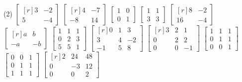 \begin{tasks}[
    start=108,
    style=enumerate,
    label-offset = 5mm,
    ](2)
    \task $\begin{bmatrix*}[r]3 & -2 \\ 5 & -4\end{bmatrix*}$
    \task $\begin{bmatrix*}[r]4 & -7 \\ -8 & 14\end{bmatrix*}$
    \task $\begin{bmatrix*}1 & 0 \\ 0 & 1\end{bmatrix*}$
    \task $\begin{bmatrix*}1 & 1 \\ 3 & 3\end{bmatrix*}$
    \task $\begin{bmatrix*}[r]8 & -2 \\ 16 & -4\end{bmatrix*}$
    \task $\begin{bmatrix*}[r]a & b \\ -a & -b\end{bmatrix*}$\newpage
    \task $\begin{bmatrix*}1 & 1 & 1 \\ 0 & 2 & 3 \\ 5 & 5 & 1\end{bmatrix*}$
    \task $\begin{bmatrix*}[r]0 & 1 & 3 \\ 3 & 4 & -2 \\ -1 & 5 & 8\end{bmatrix*}$
    \task $\begin{bmatrix*}[r]3 & 2 & 1 \\ 0 & 2 & 2 \\ 0 & 0 & -1\end{bmatrix*}$
    \task $\begin{bmatrix*}1 & 1 & 1 \\ 0 & 1 & 1 \\ 0 & 0 & 1\end{bmatrix*}$
    \task $\begin{bmatrix*}0 & 0 & 1 \\ 0 & 1 & 1 \\ 1 & 1 & 1\end{bmatrix*}$
    \task $\begin{bmatrix*}[r]2 & 24 & 48 \\ 0 & -3 & 12 \\ 0 & 0 & 2\end{bmatrix*}$

\end{tasks}
